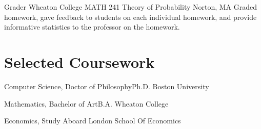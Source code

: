 \documentclass[11pt,roman]{moderncv}        %
\begin{document}
{Grader}
{Wheaton College MATH 241 Theory of Probability}
{Norton, MA}{}
{Graded homework, gave feedback to students on each individual homework,
and provide informative statistics to the professor on the homework.}





\section{Selected Coursework}

{Computer Science, \iftechnical Doctor of Philosophy\else Ph.D.\fi} {}
{Boston University} {} {}  %


{Mathematics, \iftechnical Bachelor of Art\else B.A.\fi} {}
{Wheaton College} {} {}

{Economics, Study Aboard} {}
{London School Of Economics} {} {}  %
\end{document}
